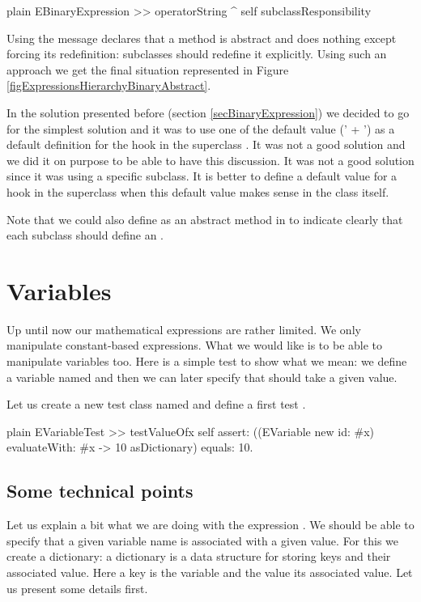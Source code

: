 \documentclass[10pt,twoside,english]{_support/latex/sbabook/sbabook}
\begin{document}
\begin{displaycode}{plain}
EBinaryExpression >> operatorString
	^ self subclassResponsibility
\end{displaycode}

Using the message  declares that a method is abstract and does nothing except forcing its redefinition: subclasses should redefine it explicitly. Using such an approach we get the final situation represented in Figure \ref{figExpressionsHierarchyBinaryAbstract}. 

In the solution presented before (section \ref{secBinaryExpression}) we decided to go for the simplest solution and it was to use one of the default value (' + ') as a default definition for the hook in the superclass .  It was not a good solution and we did it on purpose to be able to have this discussion. It was not a good solution since it was using a specific subclass. It is better to define a default value for a hook in the superclass when this default value makes sense in the class itself.

Note that we could also define  as an abstract method in  to indicate clearly that each subclass should 
define an .
\section{Variables}
Up until now our mathematical expressions are rather limited. We only manipulate constant-based expressions. What we would like is to be able to manipulate variables too. 
Here is a simple test to show what we mean: we define a variable named  and then we can later specify that  should take a given value. 

Let us create a new test class named  and define a first test .

\begin{displaycode}{plain}
EVariableTest >> testValueOfx
	self assert: ((EVariable new id: #x) evaluateWith: {#x -> 10} asDictionary) equals: 10.
\end{displaycode}
\subsection{Some technical points}
Let us explain a bit what we are doing with the expression . We should be able to specify that a given variable name is associated with a given value. For this we create a dictionary: a dictionary is a data structure for storing keys and their associated value. Here a key is the variable and the value its associated value. Let us present some details first.
\end{document}

